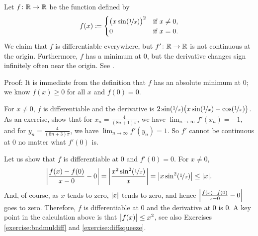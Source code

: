 \begin{example} \label{baddifffunc:example}
Let $f \colon {\mathbb{R}} \to {\mathbb{R}}$ be the function defined by
\begin{equation*}
f(x) \coloneqq
\begin{cases}
{\bigl( x \sin(\nicefrac{1}{x}) \bigr)}^2 & \text{if } x \neq 0, \\
0 & \text{if } x = 0.
\end{cases}
\end{equation*}
We claim that $f$ is differentiable everywhere, but
$f' \colon {\mathbb{R}} \to {\mathbb{R}}$ is not continuous at
the origin.  Furthermore, $f$ has a minimum at $0$, but the derivative
changes sign infinitely often near the origin.
See .
\begin{myfigureht}
\caption{A function with a discontinuous derivative. The function $f$ is on the left
and $f'$ is on the right.  Notice that $f(x) \leq x^2$ on the left graph.\label{fig:nonc1diff}}
\end{myfigureht}

Proof: It is immediate from the definition that $f$ has an absolute
minimum at $0$; we know $f(x) \geq 0$ for all $x$ and $f(0) = 0$.

For $x \neq 0$,
$f$ is differentiable
and
the derivative 
is $2 \sin (\nicefrac{1}{x}) \bigl( x \sin (\nicefrac{1}{x}) -
\cos(\nicefrac{1}{x}) \bigr)$.
As an exercise, show that for $x_n = \frac{4}{(8n+1)\pi}$,
we have
$\lim_{n\to\infty} f'(x_n) = -1$, and for
$y_n = \frac{4}{(8n+3)\pi}$, we have
$\lim_{n\to\infty} f'(y_n) = 1$.  So $f'$
cannot be continuous at $0$
no matter what $f'(0)$ is.

Let us show that $f$ is differentiable at $0$ and $f'(0)=0$.
For $x \neq 0$,
\begin{equation*}
\left\lvert {\frac{f(x)-f(0)}{x-0} - 0} \right\rvert
=
\left\lvert {\frac{x^2 \sin^2(\nicefrac{1}{x})}{x}} \right\rvert
=
\bigl\lvert {x \sin^2(\nicefrac{1}{x})} \bigr\rvert
\leq
\lvert {x} \rvert .
\end{equation*}
And, of course, as $x$ tends to zero, $\lvert {x} \rvert$ tends to zero, and hence
$\left\lvert {\frac{f(x)-f(0)}{x-0} - 0} \right\rvert$ goes to zero.  Therefore, $f$
is differentiable at 0 and the derivative at 0 is 0.
A key point in the calculation above
is that $\bigl\lvert {f(x)} \bigr\rvert \leq x^2$,
see also Exercises \ref{exercise:bndmuldiff} and
\ref{exercise:diffsqueeze}.
\end{example}

